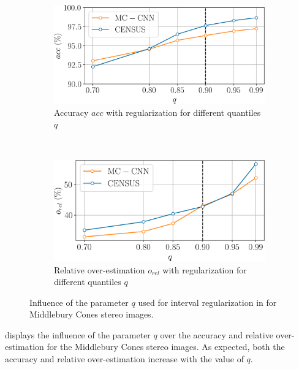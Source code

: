 \begin{figure}
    \centering
    \begin{subfigure}[t]{0.7\linewidth}
        \centering
        \includegraphics[width=\linewidth]{Images/X_Annex/ablation_study_cones_q_acc.png}
        \caption{Accuracy $acc$ with regularization for different quantiles $q$}
        \label{fig:ablation_study_q_no_reg}
    \end{subfigure}\vspace*{0.3cm}\\
    \begin{subfigure}[t]{0.7\linewidth}
        \centering
        \includegraphics[width=\linewidth]{Images/X_Annex/ablation_study_cones_q_o_rel.png}
        \caption{Relative over-estimation $o_{rel}$ with regularization for different quantiles $q$}
        \label{fig:ablation_study_q_reg}
    \end{subfigure}
    \caption{Influence of the parameter $q$ used for interval regularization in  for Middlebury Cones stereo images.}
    \label{fig:ablation_study_q}
\end{figure}

 displays the influence of the parameter $q$ over the accuracy and relative over-estimation for the Middlebury Cones stereo images. As expected, both the accuracy and relative over-estimation increase with the value of $q$.


